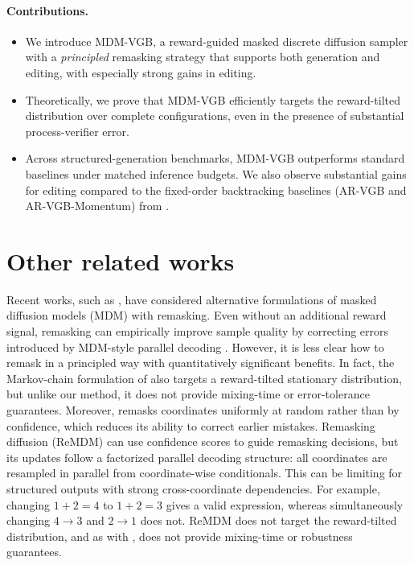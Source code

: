 \documentclass{article}
\numberwithin{theorem}{section}
\numberwithin{proposition}{section}
\numberwithin{corollary}{section}
\numberwithin{lemma}{section}
\numberwithin{conjecture}{section}
\numberwithin{remark}{section}
\numberwithin{definition}{section}
\numberwithin{assumption}{section}
\numberwithin{example}{section}
\begin{document}
\vspace{-10pt}
\paragraph{Contributions.} 
\begin{itemize}[leftmargin=30pt]
\item 
We introduce MDM-VGB, a reward-guided masked discrete diffusion sampler with a \emph{principled} remasking strategy that supports both generation and editing, with especially strong gains in editing.
\item 
Theoretically, we prove that MDM-VGB efficiently targets the reward-tilted distribution over complete configurations, even in the presence of substantial process-verifier error.
\item
Across structured-generation benchmarks, MDM-VGB outperforms standard baselines under matched inference budgets. We also observe substantial gains for editing compared to the fixed-order backtracking baselines (AR-VGB and AR-VGB-Momentum) from \citep{rohatgi2025taming}.
\end{itemize}
   


\section{Other related works}
\vspace{-8pt}

Recent works, such as \citet{wang2025remasking,Lee2025EffectiveTS},
have considered alternative formulations of masked diffusion models (MDM) with remasking. Even
without an additional reward signal, remasking can empirically improve sample
quality by correcting errors introduced by MDM-style parallel decoding \citep{wang2025remasking}. However, it is less clear how to remask in a principled way with quantitatively significant benefits. In fact,
the Markov-chain formulation of
\citet{Lee2025EffectiveTS} also targets a reward-tilted stationary distribution, but unlike our method, it does not provide mixing-time or error-tolerance guarantees. Moreover, \citet{Lee2025EffectiveTS} remasks coordinates uniformly at random rather than by confidence, which reduces its ability to correct earlier mistakes. Remasking diffusion (ReMDM)
\citep{wang2025remasking} can use confidence scores to guide remasking decisions, but its updates follow a
factorized parallel decoding structure: all coordinates are resampled in
parallel from coordinate-wise conditionals. This can
be limiting for structured outputs with strong cross-coordinate dependencies.
For example, changing \(1+2=4\) to \(1+2=3\) gives a valid expression, whereas
simultaneously changing \(4\to3\) and \(2\to1\) does not. ReMDM does not target the reward-tilted distribution, and as with \citet{Lee2025EffectiveTS}, does not provide mixing-time or robustness guarantees. 
\end{document}
